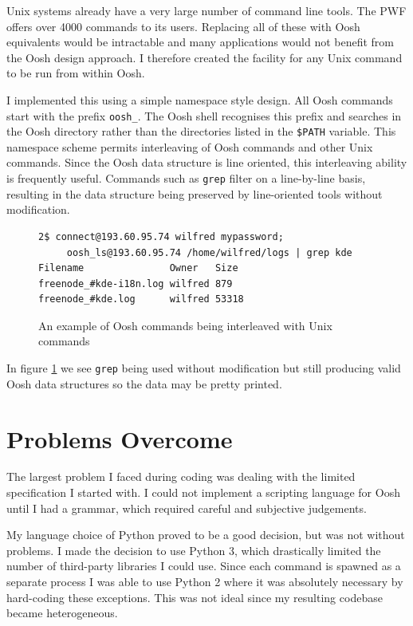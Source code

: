 \documentclass[12pt,twoside,notitlepage]{report}
\begin{document}
Unix systems already have a very large number of command line
tools. The PWF offers over 4000 commands to its users. Replacing all of these
with Oosh equivalents would be intractable and many applications would
not benefit from the Oosh design approach. I therefore created the
facility for any Unix command to be run from within Oosh. 

I implemented this using a simple namespace style design. All Oosh
commands start with the prefix {\tt oosh\_}. The Oosh shell recognises
this prefix and searches in the Oosh directory rather than the
directories listed in the {\tt \$PATH} variable. This namespace scheme
permits interleaving of Oosh commands and other Unix commands. Since
the Oosh data structure is line oriented, this interleaving ability is
frequently useful. Commands such as {\tt grep} filter on a
line-by-line basis, resulting in the data structure being preserved by
line-oriented tools without modification.

\begin{figure}[h]
\begin{verbatim}
2$ connect@193.60.95.74 wilfred mypassword;
     oosh_ls@193.60.95.74 /home/wilfred/logs | grep kde
Filename               Owner   Size
freenode_#kde-i18n.log wilfred 879
freenode_#kde.log      wilfred 53318
\end{verbatim}
\caption{An example of Oosh commands being interleaved with Unix commands}
\label{grepexample}
\end{figure}

In figure \ref{grepexample} we see {\tt grep} being used without
modification but still producing valid Oosh data structures so the
data may be pretty printed.

\section{Problems Overcome}

The largest problem I faced during coding was dealing with the limited
specification I started with. I could not implement a scripting
language for Oosh until I had a grammar, which required careful and
subjective judgements.

My language choice of Python proved to be a good decision, but was not
without problems. I made the decision to use Python 3, which
drastically limited the number of third-party libraries I could
use. Since each command is spawned as a separate process I was able to
use Python 2 where it was absolutely necessary by hard-coding these
exceptions. This was not ideal since my resulting codebase became
heterogeneous.
\end{document}

